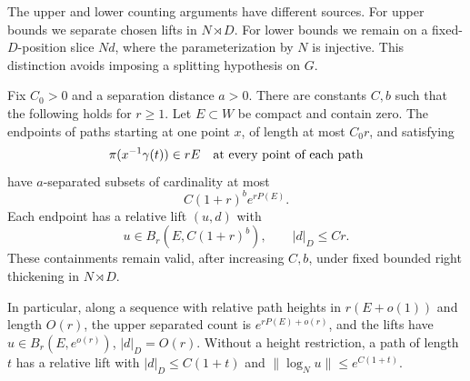 The upper and lower counting arguments have different sources.
For upper bounds we separate chosen lifts in $N\rtimes D$.
For lower bounds we remain on a fixed-$D$-position slice $Nd$, where the
parameterization by $N$ is injective. This distinction avoids
imposing a splitting hypothesis on $G$.

\begin{lemma}\label{lem:path-packing}
Fix $C_0>0$ and a separation distance $a>0$. There are constants
$C,b$ such that the following holds for $r\ge1$. Let $E\subset W$
be compact and contain zero. The endpoints of paths starting at
one point $x$, of length at most $C_0r$, and satisfying
\[
 \pi(x^{-1}\gamma(t))\in rE
 \quad\hbox{at every point of each path}
\]
have $a$-separated subsets of cardinality at most
\begin{equation}\label{eq:finite-path-packing}
 C(1+r)^b e^{rP(E)}.
\end{equation}
Each endpoint has a relative lift $(u,d)$ with
\[
 u\in B_r(E,C(1+r)^b),\qquad |d|_D\le Cr.
\]
These containments remain valid, after increasing $C,b$, under
fixed bounded right thickening in $N\rtimes D$.

In particular, along a sequence with relative path heights in
$r(E+o(1))$ and length $O(r)$, the upper separated count is
$e^{rP(E)+o(r)}$, and the lifts have $u\in B_r(E,e^{o(r)})$,
$|d|_D=O(r)$. Without a height restriction, a path of length $t$
has a relative lift with $|d|_D\le C(1+t)$ and
$\|\log_Nu\|\le e^{C(1+t)}$.
\end{lemma}

